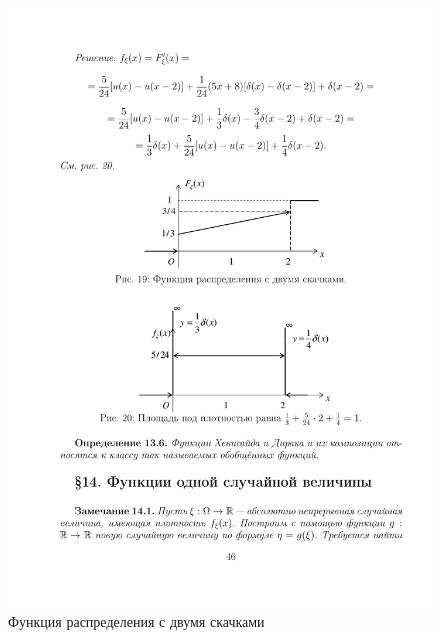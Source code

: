 \begin{figure}[H]
	\centering
	\includegraphics[]{pic/pic19}
	\caption{Функция распределения с двумя скачками}
	\label{fig19}
\end{figure}
